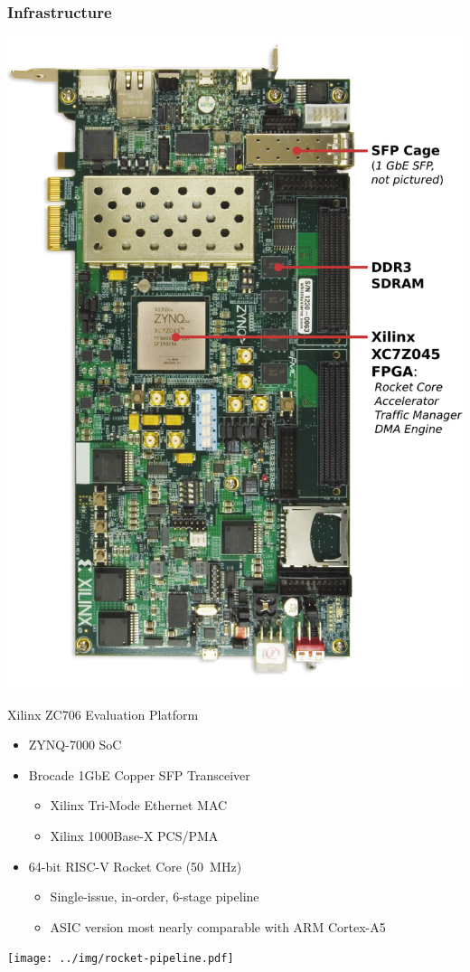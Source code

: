 \frametitle{Infrastructure}

\begin{minipage}{0.4\linewidth}
\includegraphics[width=\linewidth]{../img/zc706.pdf}
\end{minipage}
\hfill
\begin{minipage}{0.55\linewidth}
\alert{Xilinx ZC706 Evaluation Platform}
\begin{itemize}
\item ZYNQ-7000 SoC
\item Brocade 1GbE Copper SFP Transceiver
	\begin{itemize}
	\footnotesize
        \item Xilinx Tri-Mode Ethernet MAC
        \item Xilinx 1000Base-X PCS/PMA
	\end{itemize}
\item 64-bit RISC-V Rocket Core (\SI{50}{\mega\hertz})
	\begin{itemize}
	\footnotesize
	\item Single-issue, in-order, 6-stage pipeline
	\item ASIC version most nearly comparable with ARM Cortex-A5
	\end{itemize}
\end{itemize}
\vspace{\baselineskip}
\texttt{[image: ../img/rocket-pipeline.pdf]}
\end{minipage}

